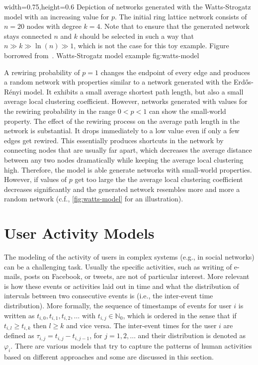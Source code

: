       {width=0.75\textwidth,height=0.6\textheight}
      {Depiction of networks generated with the Watts-Strogatz model with an increasing value for \( p \). The initial ring lattice network consists of \( n = 20 \) nodes with degree \( k = 4 \). Note that to ensure that the generated network stays connected \( n \) and \( k \) should be selected in such a way that \( n \gg k \gg \ln(n) \gg 1 \), which is not the case for this toy example. Figure borrowed from~\cite{Watts1998}.}
      {Watts-Strogatz model example}
      {fig:watts-model}


A rewiring probability of \( p = 1 \) changes the endpoint of every edge and produces a random network with properties similar to a network generated with the Erdős-Rényi model.
It exhibits a small average shortest path length, but also a small average local clustering coefficient.
However, networks generated with values for the rewiring probability in the range \( 0 < p < 1 \) can show the small-world property.
The effect of the rewiring process on the average path length in the network is substantial.
It drops immediately to a low value even if only a few edges get rewired.
This essentially produces shortcuts in the network by connecting nodes that are usually far apart, which decreases the average distance between any two nodes dramatically while keeping the average local clustering high.
Therefore, the model is able generate networks with small-world properties.
However, if values of \( p \) get too large the the average local clustering coefficient decreases significantly and the generated network resembles more and more a random network (c.f., \cref{fig:watts-model} for an illustration).




\section{User Activity Models}
\label{sec:user-activity-models}

The modeling of the activity of users in complex systems (e.g., in social networks) can be a challenging task.
Usually the specific activities, such as writing of e-mails, posts on  Facebook, or tweets, are not of particular interest.
More relevant is how these events or activities laid out in time and what the distribution of intervals between two consecutive events is (i.e., the inter-event time distribution).
More formally, the sequence of timestamps of events for user \( i \) is written as \(t_{i,0}, t_{i,1}, t_{i,2}, \ldots \) with \( t_{i,j} \in \mathbb{N}_0 \), which is ordered in the sense that if \( t_{i,l} \ge  t_{i,k} \) then \( l \ge k \) and vice versa.
The inter-event times for the user \( i \) are defined as \( \tau_{i,j} = t_{i,j} - t_{i,j-1} \), for \(j = 1, 2, \ldots \) and their distribution is denoted as \( \varphi_{i} \).
There are various models that try to capture the patterns of human activities based on different approaches and some are discussed in this section.

